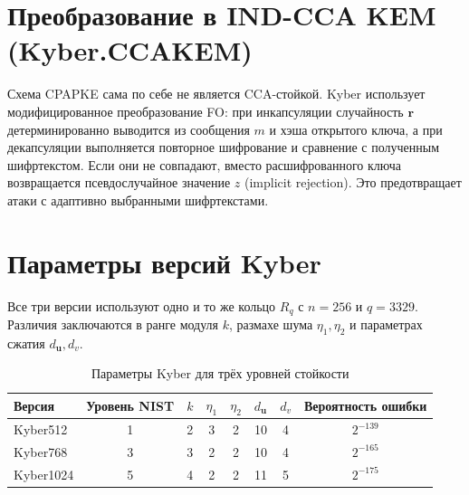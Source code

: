 \documentclass[11pt,a4paper]{article}
\begin{document}
\newpage
\section{Преобразование в IND-CCA KEM (Kyber.CCAKEM)}

Схема CPAPKE сама по себе не является CCA-стойкой. Kyber использует модифицированное преобразование FO: при инкапсуляции случайность \(\mathbf{r}\) детерминированно выводится из сообщения \(m\) и хэша открытого ключа, а при декапсуляции выполняется повторное шифрование и сравнение с полученным шифртекстом. Если они не совпадают, вместо расшифрованного ключа возвращается псевдослучайное значение \(z\) (implicit rejection). Это предотвращает атаки с адаптивно выбранными шифртекстами.

\newpage
\section{Параметры версий Kyber}

Все три версии используют одно и то же кольцо \(R_q\) с \(n = 256\) и \(q = 3329\). Различия заключаются в ранге модуля \(k\), размахе шума \(\eta_1, \eta_2\) и параметрах сжатия \(d_{\mathbf{u}}, d_v\).

\begin{table}[H]
    \centering
    \caption{Параметры Kyber для трёх уровней стойкости}
    \begin{tabular}{lccccccc}
        \toprule
        Версия    & Уровень NIST & \(k\) & \(\eta_1\) & \(\eta_2\) & \(d_{\mathbf{u}}\) & \(d_v\) & Вероятность ошибки \\
        \midrule
        Kyber512  & 1            & 2     & 3          & 2          & 10                 & 4       & \(2^{-139}\)       \\
        Kyber768  & 3            & 3     & 2          & 2          & 10                 & 4       & \(2^{-165}\)       \\
        Kyber1024 & 5            & 4     & 2          & 2          & 11                 & 5       & \(2^{-175}\)       \\
        \bottomrule
    \end{tabular}
\end{table}
\end{document}
